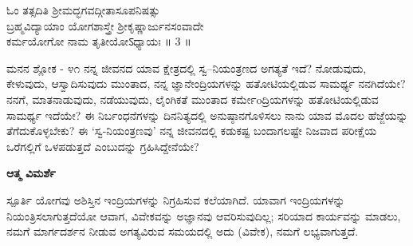 \begin{center}
ಓಂ ತತ್ಸದಿತಿ ಶ್ರೀಮದ್ಭಗವದ್ಗೀತಾಸೂಪನಿಷತ್ಸು \\ಬ್ರಹ್ಮವಿದ್ಯಾಯಾಂ ಯೋಗಶಾಸ್ತ್ರೇ ಶ್ರೀಕೃಷ್ಣಾರ್ಜುನಸಂವಾದೇ\\
ಕರ್ಮಯೋಗೋ ನಾಮ ತೃತೀಯೋऽಧ್ಯಾಯಃ ॥ 3 ॥
\end{center}

\newpage
\begin{mananam}{\mananamfont ಮನನ ಶ್ಲೋಕ - ೪೧}
\mananamtext ನನ್ನ ಜೀವನದ ಯಾವ ಕ್ಷೇತ್ರದಲ್ಲಿ ಸ್ವ–ನಿಯಂತ್ರಣದ ಅಗತ್ಯತೆ ಇದೆ? ನೋಡುವುದು, ಕೇಳುವುದು, ಆಸ್ವಾದಿಸುವುದು ಮುಂತಾದ, ನನ್ನ ಜ್ಞಾನೇಂದ್ರಿಯಗಳನ್ನು ಹತೋಟಿಯಲ್ಲಿಡುವ ಸಾಮರ್ಥ್ಯ ನನಗಿದೆಯೇ? ನನಗೆ,  ಮಾತನಾಡುವುದು, ನಡೆಯುವುದು, ಲೈಂಗಿಕತೆ ಮುಂತಾದ ಕರ್ಮೇoದ್ರಿಯಗಳನ್ನು  ಹತೋಟಿಯಲ್ಲಿಡುವ ಸಾಮರ್ಥ್ಯ ಇದೆಯೇ? ಈ ನಿರ್ಬಂಧನೆಗಳನ್ನು ದಿನನಿತ್ಯದಲ್ಲಿ ಅನುಷ್ಠಾನಗೊಳಿಸಲು ನಾನು ಯಾವ ಮೊದಲ ಹೆಜ್ಜೆಯನ್ನು ತೆಗೆದುಕೊಳ್ಳಬೇಕು? ಈ ‘ಸ್ವ-ನಿಯಂತ್ರಣವು’ ನನ್ನ ಜೀವನದಲ್ಲಿ ಕಡುಕಷ್ಟ ಬಂದಾಗಲಷ್ಟೇ ನಿಜವಾದ ಪರೀಕ್ಷೆಯ ಒರೆಗಲ್ಲಿಗೆ ಒಳಪಡುತ್ತದೆ ಎಂಬುದನ್ನು ಗ್ರಹಿಸಿದ್ದೇನೆಯೇ? 
\end{mananam}
\WritingHand\enspace\textbf{ಆತ್ಮ ವಿಮರ್ಶೆ}\\
\begin{inspiration}{\mananamfont ಸ್ಪೂರ್ತಿ}
\mananamtext ಯೋಗವು ಅಶಿಸ್ತಿನ ಇಂದ್ರಿಯಗಳನ್ನು ನಿಗ್ರಹಿಸುವ ಕಲೆಯಾಗಿದೆ. ಯಾವಾಗ ಇಂದ್ರಿಯಗಳನ್ನು ನಿಯಂತ್ರಿಸಲಾಗುತ್ತದೆಯೋ ಆವಾಗ, ವಿವೇಕವನ್ನು ಅಜ್ಞಾನವು ಆವರಿಸುವುದಿಲ್ಲ; ಸರಿಯಾದ ಕಾರ್ಯವನ್ನು ಮಾಡಲು, ನಮಗೆ ಮಾರ್ಗದರ್ಶನ ನೀಡುವ ಅಗತ್ಯವಿರುವ ಸಮಯದಲ್ಲಿ ಅದು (ವಿವೇಕ), ನಮಗೆ ಲಭ್ಯವಾಗುತ್ತದೆ.
\end{inspiration}

